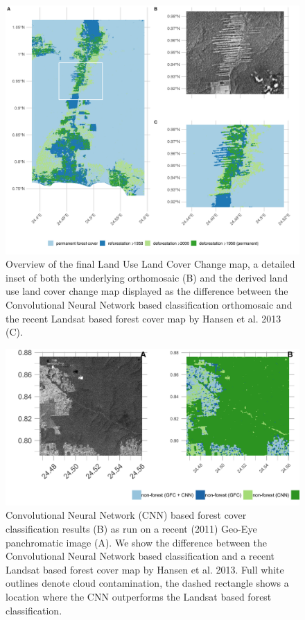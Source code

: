 \documentclass[remote sensing,article,submit,moreauthors,pdftex]{mdpi}
\begin{document}
\begin{figure}

{\centering \includegraphics[width=1\linewidth]{./figures/forest_cover_map} 

}

\caption{Overview of the final Land Use Land Cover Change map, a detailed inset of both the underlying orthomosaic (B) and the derived land use land cover change map displayed as the difference between the Convolutional Neural Network based classification orthomosaic and the recent Landsat based forest cover map by Hansen et al. 2013 (C).}\label{fig:unnamed-chunk-8}
\end{figure}

\begin{figure}

{\centering \includegraphics[width=1\linewidth]{./figures/visual_comparison_classifiers} 

}

\caption{Convolutional Neural Network (CNN) based forest cover classification results (B) as run on a recent (2011) Geo-Eye panchromatic image (A). We show the difference between the Convolutional Neural Network based classification and a recent Landsat based forest cover map by Hansen et al. 2013. Full white outlines denote cloud contamination, the dashed rectangle shows a location where the CNN outperforms the Landsat based forest classification.}\label{fig:unnamed-chunk-9}
\end{figure}
\end{document}
